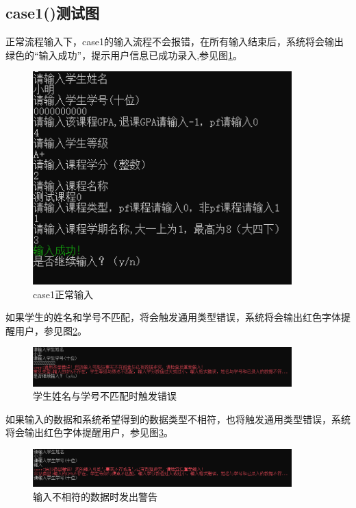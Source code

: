 \documentclass[fontset=windows]{article}
\begin{document}
\subsection{case1()测试图}

正常流程输入下，case1的输入流程不会报错，在所有输入结束后，系统将会输出绿色的“输入成功”，提示用户信息已成功录入,参见图\ref{ref1}。
\begin{figure}[h!]
	\begin{center}
		\includegraphics[width = 10cm]{case1 正常输入.png}
		\caption{case1正常输入}
		\label{ref1}
	\end{center}
\end{figure}

如果学生的姓名和学号不匹配，将会触发通用类型错误，系统将会输出红色字体提醒用户，参见图\ref{ref2}。

\begin{figure}[h!]
	\begin{center}
		\vspace{-0.3cm}
		\includegraphics[width = 10cm]{学生姓名与学号不匹配触发错误.png}
		\caption{学生姓名与学号不匹配时触发错误}
		\label{ref2}
	\end{center}
\end{figure}

如果输入的数据和系统希望得到的数据类型不相符，也将触发通用类型错误，系统将会输出红色字体提醒用户，参见图\ref{ref3}。

\begin{figure}[h!]
	\begin{center}
		\vspace{-0.3cm}
		\includegraphics[width = 10cm]{输入不相符的数据时发出警告.png}
		\caption{输入不相符的数据时发出警告}
		\label{ref3}
	\end{center}
\end{figure}
\newpage
\end{document}
